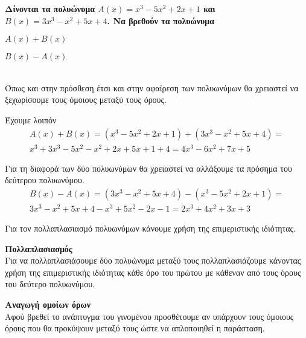 \documentclass[twoside,nofonts,internet,methodoi]{thewria}
\begin{document}
\textbf{Δίνονται τα πολυώνυμα {\boldmath$ A(x)=x^3-5x^2+2x+1 $} και {\boldmath$ B(x)=3x^3-x^2+5x+4$}. Να βρεθούν τα πολυώνυμα}
{\boldmath
\begin{multicols}{2}
\begin{brlist}
\item $ A(x)+B(x) $
\item $ B(x)-A(x) $
\end{brlist}
\end{multicols}}
\lysh\\
Όπως και στην πρόσθεση έτσι και στην αφαίρεση των πολυωνύμων θα χρειαστεί να ξεχωρίσουμε τους όμοιους μεταξύ τους όρους.
\begin{rlist}
\item Έχουμε λοιπόν
\begin{gather*}
A(x)+B(x)=\left( x^3-5x^2+2x+1\right) +\left( 3x^3-x^2+5x+4\right)=\\
x^3+3x^3-5x^2-x^2+2x+5x+1+4=4x^3-6x^2+7x+5
\end{gather*}
\item Για τη διαφορά των δύο πολυωνύμων θα χρειαστεί να αλλάξουμε τα πρόσημα του δεύτερου πολυωνύμου.
\begin{gather*}
B(x)-A(x)=\left( 3x^3-x^2+5x+4\right)-\left( x^3-5x^2+2x+1\right)=\\
3x^3-x^2+5x+4-x^3+5x^2-2x-1=2x^3+4x^2+3x+3
\end{gather*}
\end{rlist}
\begin{Methodos}
Για τον πολλαπλασιασμό πολυωνύμων κάνουμε χρήση της επιμεριστικής ιδιότητας.
\begin{bhma}
\item \textbf{Πολλαπλασιασμός}\\
Για να πολλαπλασιάσουμε δύο πολυώνυμα μεταξύ τους πολλαπλασιάζουμε κάνοντας χρήση της επιμεριστικής ιδιότητας κάθε όρο του πρώτου με κάθεναν από τους όρους του δεύτερο πολυωνύμου.
\item \textbf{Αναγωγή ομοίων όρων}\\
Αφού βρεθεί το ανάπτυγμα του γινομένου προσθέτουμε αν υπάρχουν τους όμοιους όρους που θα προκύψουν μεταξύ τους ώστε να απλοποιηθεί η παράσταση.
\end{bhma}
\end{Methodos}
\end{document}
